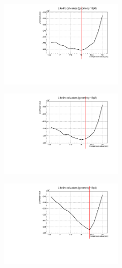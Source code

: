 \documentclass[a4paper, 11pt]{report}
\begin{document}
\begin{figure}[htbp]
\begin{minipage}[b]{.32\textwidth}
\includegraphics[width=6cm, height=4.6cm]{figs/likelihood250LowStat/likelihood18p0.pdf}
\end{minipage}\hfill
\begin{minipage}[b]{.32\textwidth}
\includegraphics[width=6cm, height=4.6cm]{figs/likelihood250LowStat/likelihood18p2.pdf}
\end{minipage} \hfill
\begin{minipage}[b]{.32\textwidth}
\includegraphics[width=6cm, height=4.6cm]{figs/likelihood250LowStat/likelihood18p4.pdf}
\end{minipage} \hfill \vspace{10pt}


\end{figure}
\end{document}
